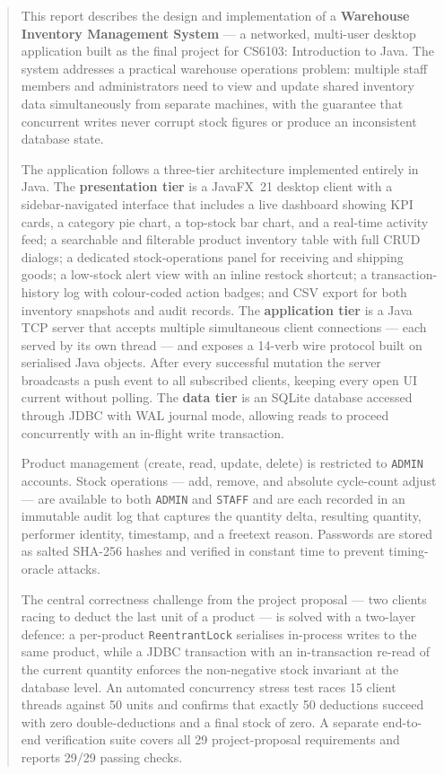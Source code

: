 \documentclass[12pt,a4paper]{article}
\begin{document}
\begin{abstract}
This report describes the design and implementation of a \textbf{Warehouse Inventory
Management System} --- a networked, multi-user desktop application built as the final
project for CS6103: Introduction to Java. The system addresses a practical warehouse
operations problem: multiple staff members and administrators need to view and update
shared inventory data simultaneously from separate machines, with the guarantee that
concurrent writes never corrupt stock figures or produce an inconsistent database state.

The application follows a three-tier architecture implemented entirely in Java. The
\textbf{presentation tier} is a JavaFX~21 desktop client with a sidebar-navigated
interface that includes a live dashboard showing KPI cards, a category pie chart, a
top-stock bar chart, and a real-time activity feed; a searchable and filterable product
inventory table with full CRUD dialogs; a dedicated stock-operations panel for receiving
and shipping goods; a low-stock alert view with an inline restock shortcut; a
transaction-history log with colour-coded action badges; and CSV export for both
inventory snapshots and audit records. The \textbf{application tier} is a Java TCP
server that accepts multiple simultaneous client connections --- each served by its own
thread --- and exposes a 14-verb wire protocol built on serialised Java objects. After
every successful mutation the server broadcasts a push event to all subscribed clients,
keeping every open UI current without polling. The \textbf{data tier} is an SQLite
database accessed through JDBC with WAL journal mode, allowing reads to proceed
concurrently with an in-flight write transaction.

Product management (create, read, update, delete) is restricted to
\texttt{ADMIN} accounts. Stock operations --- add, remove, and absolute
cycle-count adjust --- are available to both \texttt{ADMIN} and \texttt{STAFF} and
are each recorded in an immutable audit log that captures the quantity delta, resulting
quantity, performer identity, timestamp, and a freetext reason. Passwords are stored as
salted SHA-256 hashes and verified in constant time to prevent timing-oracle attacks.

The central correctness challenge from the project proposal --- two clients racing to
deduct the last unit of a product --- is solved with a two-layer defence: a per-product
\texttt{ReentrantLock} serialises in-process writes to the same product, while a JDBC
transaction with an in-transaction re-read of the current quantity enforces the
non-negative stock invariant at the database level. An automated concurrency stress test
races 15 client threads against 50 units and confirms that exactly 50 deductions
succeed with zero double-deductions and a final stock of zero. A separate end-to-end
verification suite covers all 29 project-proposal requirements and reports 29/29 passing
checks.
\end{abstract}
\end{document}
